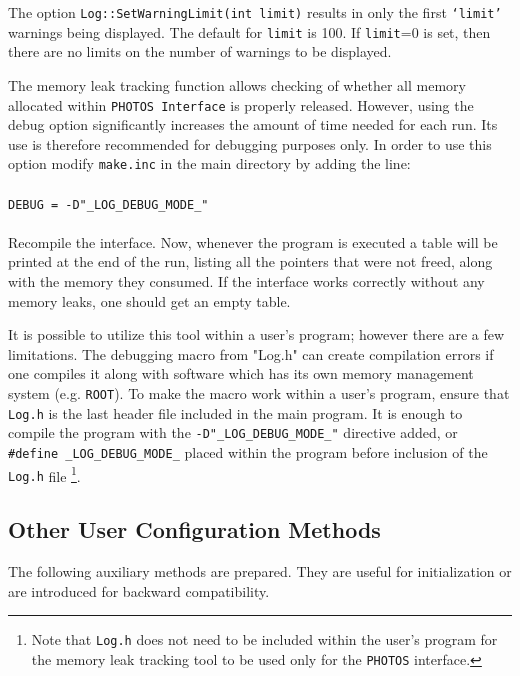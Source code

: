 \documentclass[]{Photos_interface_design}
\begin{document}
The option {\tt Log::SetWarningLimit(int limit)} results in 
only the first {\tt `limit'} warnings being displayed. The default for {\tt limit} is 100. 
If {\tt limit}=0 is set, then there are no limits on the number of warnings to be displayed.

The memory leak tracking function allows checking of whether all memory allocated within {\tt PHOTOS Interface}
 is properly released. However, using the debug option significantly increases the amount of time needed for 
each run. Its  use is therefore recommended  for debugging purposes only. In order to use this option
 modify {\tt make.inc} in the main directory by adding the line: \\
\\ {\tt DEBUG = -D"\_LOG\_DEBUG\_MODE\_" } \\ \\
Recompile the interface.
Now, whenever the program is executed a table will be printed at the end of the run,
listing all the pointers that were not freed, along with the memory they consumed.
If the interface works correctly without any memory leaks, one should get an empty table.

It is possible to utilize this tool within a user's program; however there are a few limitations.
The debugging macro from "Log.h" can create compilation errors if one compiles
it along with software which has its own memory management system (e.g. {\tt ROOT}).
To make the macro work within a user's program, ensure that {\tt Log.h} is the last header file
included in the main program.
It is enough to  compile the program with the {\tt -D"\_LOG\_DEBUG\_MODE\_"} directive added,
or {\tt \#define \_LOG\_DEBUG\_MODE\_} placed within the program before inclusion of
 the {\tt Log.h} file%
\footnote{Note that {\tt Log.h} does not need to be included within
the user's program  for the memory leak tracking tool to be used only for the {\tt PHOTOS} interface.
}.

\subsection{Other User Configuration Methods}
\label{subsection:other_methods}

The following auxiliary methods are prepared. They are useful for initialization 
or are introduced for backward compatibility.
\end{document}
